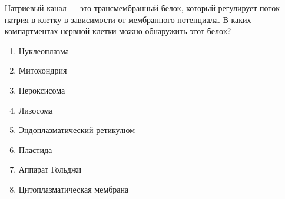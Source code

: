 
Натриевый
канал — это трансмембранный белок, который регулирует поток натрия в клетку в
зависимости от мембранного потенциала. В каких компартментах нервной клетки
можно обнаружить этот белок?

\begin{enumerate}
    \item Нуклеоплазма
    \item Митохондрия
    \item Пероксисома
    \item Лизосома
    \item Эндоплазматический ретикулюм
    \item Пластида
    \item Аппарат Гольджи
    \item Цитоплазматическая мембрана
\end{enumerate}

